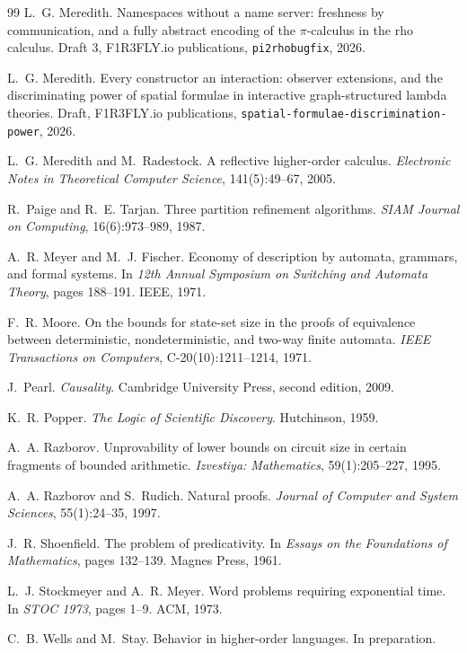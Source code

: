 \documentclass[11pt]{article}
\theoremstyle{definition}
\theoremstyle{plain}
\theoremstyle{remark}
\begin{document}
\begin{thebibliography}{99}
L.~G. Meredith.
\newblock Namespaces without a name server: freshness by communication,
and a fully abstract encoding of the $\pi$-calculus in the rho calculus.
\newblock Draft 3, F1R3FLY.io publications, \texttt{pi2rhobugfix}, 2026.

L.~G. Meredith.
\newblock Every constructor an interaction: observer extensions, and the
discriminating power of spatial formulae in interactive graph-structured
lambda theories.
\newblock Draft, F1R3FLY.io publications,
\texttt{spatial-formulae-discrimination-power}, 2026.

L.~G. Meredith and M.~Radestock.
\newblock A reflective higher-order calculus.
\newblock \emph{Electronic Notes in Theoretical Computer Science},
141(5):49--67, 2005.

R.~Paige and R.~E. Tarjan.
\newblock Three partition refinement algorithms.
\newblock \emph{SIAM Journal on Computing}, 16(6):973--989, 1987.

A.~R. Meyer and M.~J. Fischer.
\newblock Economy of description by automata, grammars, and formal
systems.
\newblock In \emph{12th Annual Symposium on Switching and Automata
Theory}, pages 188--191. IEEE, 1971.

F.~R. Moore.
\newblock On the bounds for state-set size in the proofs of equivalence
between deterministic, nondeterministic, and two-way finite automata.
\newblock \emph{IEEE Transactions on Computers}, C-20(10):1211--1214,
1971.

J.~Pearl.
\newblock \emph{Causality}.
\newblock Cambridge University Press, second edition, 2009.

K.~R. Popper.
\newblock \emph{The Logic of Scientific Discovery}.
\newblock Hutchinson, 1959.

A.~A. Razborov.
\newblock Unprovability of lower bounds on circuit size in certain
fragments of bounded arithmetic.
\newblock \emph{Izvestiya: Mathematics}, 59(1):205--227, 1995.

A.~A. Razborov and S.~Rudich.
\newblock Natural proofs.
\newblock \emph{Journal of Computer and System Sciences}, 55(1):24--35,
1997.

J.~R. Shoenfield.
\newblock The problem of predicativity.
\newblock In \emph{Essays on the Foundations of Mathematics}, pages
132--139. Magnes Press, 1961.

L.~J. Stockmeyer and A.~R. Meyer.
\newblock Word problems requiring exponential time.
\newblock In \emph{STOC 1973}, pages 1--9. ACM, 1973.

C.~B. Wells and M.~Stay.
\newblock Behavior in higher-order languages.
\newblock In preparation.

\end{thebibliography}
\end{document}
